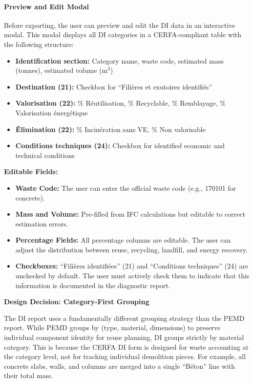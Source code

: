 \documentclass[11pt,a4paper]{article}
\begin{document}
\paragraph{Preview and Edit Modal}

Before exporting, the user can preview and edit the DI data in an interactive modal. This modal displays all DI categories in a CERFA-compliant table with the following structure:

\begin{itemize}
    \item \textbf{Identification section:} Category name, waste code, estimated mass (tonnes), estimated volume (m$^3$)
    \item \textbf{Destination (21):} Checkbox for ``Fili\`{e}res et exutoires identifi\'{e}s''
    \item \textbf{Valorisation (22):} \% R\'{e}utilisation, \% Recyclable, \% Remblayage, \% Valorisation \'{e}nerg\'{e}tique
    \item \textbf{\'{E}limination (22):} \% Incin\'{e}ration sans VE, \% Non valorisable
    \item \textbf{Conditions techniques (24):} Checkbox for identified economic and technical conditions
\end{itemize}

\noindent\textbf{Editable Fields:}
\begin{itemize}
    \item \textbf{Waste Code:} The user can enter the official waste code (e.g., 170101 for concrete).
    \item \textbf{Mass and Volume:} Pre-filled from IFC calculations but editable to correct estimation errors.
    \item \textbf{Percentage Fields:} All percentage columns are editable. The user can adjust the distribution between reuse, recycling, landfill, and energy recovery.
    \item \textbf{Checkboxes:} ``Fili\`{e}res identifi\'{e}es'' (21) and ``Conditions techniques'' (24) are unchecked by default. The user must actively check them to indicate that this information is documented in the diagnostic report.
\end{itemize}

\noindent\textbf{Design Decision: Category-First Grouping}

The DI report uses a fundamentally different grouping strategy than the PEMD report. While PEMD groups by (type, material, dimensions) to preserve individual component identity for reuse planning, DI groups strictly by material category. This is because the CERFA DI form is designed for waste accounting at the category level, not for tracking individual demolition pieces. For example, all concrete slabs, walls, and columns are merged into a single ``B\'{e}ton'' line with their total mass.
\end{document}
